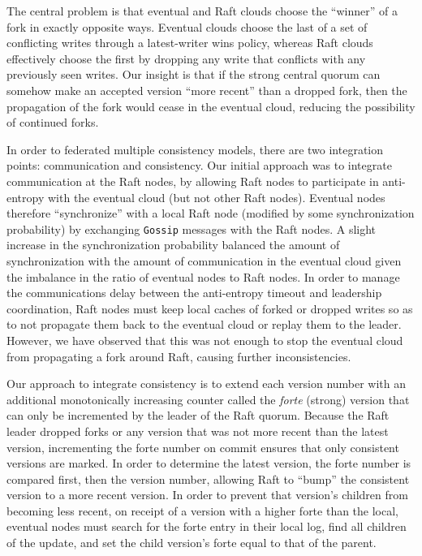 \documentclass{article}
\begin{document}
The central problem is that eventual and Raft clouds choose the ``winner'' of a fork in exactly opposite ways. Eventual clouds choose the last of a set of conflicting writes through a latest-writer wins policy, whereas Raft clouds effectively choose the first by dropping any write that conflicts with any previously seen writes. Our insight is that if the strong central quorum can somehow make an accepted version ``more recent'' than a dropped fork, then the propagation of the fork would cease in the eventual cloud, reducing the possibility of continued forks.

In order to federated multiple consistency models, there are two integration points: communication and consistency. Our initial approach was to integrate communication at the Raft nodes, by allowing Raft nodes to participate in anti-entropy with the eventual cloud (but not other Raft nodes). Eventual nodes therefore ``synchronize'' with a local Raft node (modified by some synchronization probability) by exchanging \texttt{Gossip} messages with the Raft nodes. A slight increase in the synchronization probability balanced the amount of synchronization with the amount of communication in the eventual cloud given the imbalance in the ratio of eventual nodes to Raft nodes. In order to manage the communications delay between the anti-entropy timeout and leadership coordination, Raft nodes must keep local caches of forked or dropped writes so as to not propagate them back to the eventual cloud or replay them to the leader. However, we have observed that this was not enough to stop the eventual cloud from propagating a fork around Raft, causing further inconsistencies.

Our approach to integrate consistency is to extend each version number with an additional monotonically increasing counter called the \textit{forte} (strong) version that can only be incremented by the leader of the Raft quorum. Because the Raft leader dropped forks or any version that was not more recent than the latest version, incrementing the forte number on commit ensures that only consistent versions are marked. In order to determine the latest version, the forte number is compared first, then the version number, allowing Raft to ``bump'' the consistent version to a more recent version. In order to prevent that version's children from becoming less recent, on receipt of a version with a higher forte than the local, eventual nodes must search for the forte entry in their local log, find all children of the update, and set the child version's forte equal to that of the parent.
\end{document}
